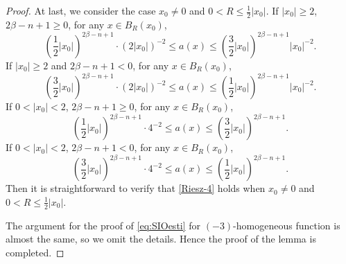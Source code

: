 \documentclass[12pt]{amsart}
\begin{document}
\begin{proof}
		At last, we consider the case $x_0\neq 0$ and $0< R\leq  \frac12 |x_0|$. If $|x_0|\geq 2$, $2\beta-n+1 \geq 0$, for any $x \in B_R(x_0)$, 
		\begin{equation*}\label{Riesz-11}
			\left(\frac12 |x_0|\right)^{2\beta-n+1} \cdot (2|x_0|)^{-2} \leq a(x) \leq \left( \frac32 |x_0| \right)^{2\beta-n+1} |x_0|^{-2}. 
		\end{equation*}
		If $|x_0|\geq 2$ and $2\beta-n+1 < 0$, for any $x \in B_R(x_0)$, 
		\begin{equation*}\label{Riesz-12}
			\left(\frac32 |x_0|\right)^{2\beta-n+1} \cdot (2|x_0|)^{-2} \leq a(x) \leq \left( \frac12 |x_0| \right)^{2\beta-n+1} |x_0|^{-2}.
		\end{equation*}
		If $0< |x_0| < 2$, $2\beta-n+1 \geq 0$,  for any $x \in B_R(x_0)$, 
		\begin{equation*}\label{Riesz-15}
			\left(\frac12 |x_0|\right)^{2\beta-n+1} \cdot 4^{-2} \leq a(x) \leq \left( \frac32 |x_0| \right)^{2\beta-n+1}.
		\end{equation*}
		If $0< |x_0| < 2$, $2\beta-n+1 < 0$,  for any $x \in B_R(x_0)$, 
		\begin{equation*}\label{Riesz-12new}
			\left(\frac32 |x_0|\right)^{2\beta-n+1} \cdot 4^{-2} \leq a(x) \leq \left( \frac12 |x_0| \right)^{2\beta-n+1}.
		\end{equation*}
		Then it is straightforward to verify that \eqref{Riesz-4} holds when $x_0\neq 0$ and $0< R \leq \frac12 |x_0|$. 
		
		The argument for the proof of \eqref{eq:SIOesti} for $(-3)$-homogeneous function is almost the same, so we omit the details. Hence the proof of the lemma is completed.
	\end{proof}
	
	
	
\end{document}
